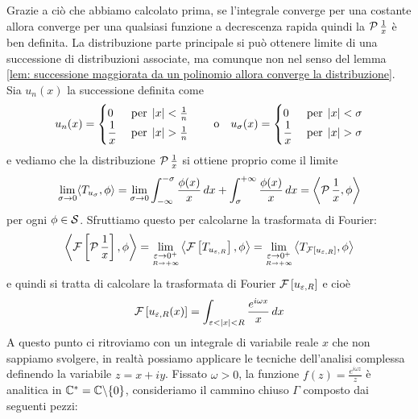 Grazie a ciò che abbiamo calcolato prima, se l'integrale converge per una costante allora converge per una qualsiasi funzione a decrescenza rapida 
quindi la $ \P \frac1x $ è ben definita. La distribuzione parte principale si può ottenere limite di una successione di distribuzioni associate, 
ma comunque non nel senso del lemma \ref{lem: successione maggiorata da un polinomio allora converge la distribuzione}. Sia $ u_n(x) $ la successione 
definita come 
\begin{align}
  u_n(x) = 
  \begin{cases}
    \DS 0 \; &\textnormal{per}\; \abs{x} < \frac1n
    \\
    \DS\frac1x \; &\textnormal{per}\; \abs{x} > \frac1n
  \end{cases}
  \qquad \textnormal{o} \quad u_{\sigma}(x) = 
  \begin{cases}
    \DS 0 \; &\textnormal{per}\; \abs{x} < \sigma
    \\
    \DS\frac1x \; &\textnormal{per}\; \abs{x} > \sigma
  \end{cases}
\end{align}
e vediamo che la distribuzione $ \P \frac1x $ si ottiene proprio come il limite 
\begin{align}
  \lim_{\sigma \to 0} \sc{T_{u_\sigma}, \phi} 
  = \lim_{\sigma\to0} \int_{-\infty}^{-\sigma} \frac{\phi(x)}{x} \, dx + \int_{\sigma}^{+\infty} \frac{\phi(x)}{x} \, dx = \sca{\P\frac1x, \phi}
\end{align}
per ogni $ \phi \in \S $. Sfruttiamo questo per calcolarne la trasformata di Fourier:
\begin{gather}
  \sca{\F\left[ \P\frac1x \right], \phi} 
  = \lim_{\un{\eps\to0^+}{R\to+\infty}} \sca{\F\left[ T_{u_{\eps,R}} \right], \phi} 
  = \lim_{\un{\eps\to0^+}{R\to+\infty}} \sca{T_{\F\left[ u_{\eps,R} \right]}, \phi} 
\end{gather}
e quindi si tratta di calcolare la trasformata di Fourier $ \F\left[ u_{\eps, R} \right] $ e cioè
\begin{align}
  \F\left[ u_{\eps, R}(x) \right] = \int_{\eps < \abs{x} < R}  \frac{e^{i\omega x}}x \,dx
\end{align}
A questo punto ci ritroviamo con un integrale di variabile reale $ x $ che non sappiamo svolgere,
in realtà possiamo applicare le tecniche dell'analisi complessa definendo la variabile $ z = x + i y $. 
Fissato $ \omega > 0 $, la funzione $ f(z)=\frac{e^{i\omega z}}{z} $ è analitica in $ \C^* = \C \bs\{0\} $, 
consideriamo il cammino chiuso $ \Gamma $ composto dai seguenti pezzi:
